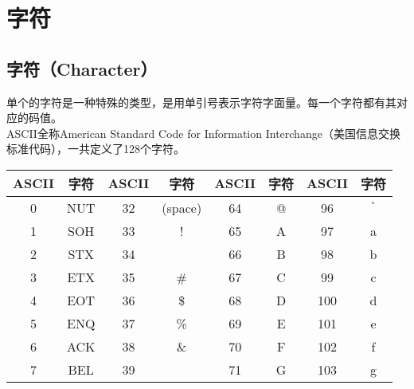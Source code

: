 \newpage

\section{字符}

\subsection{字符（Character）}

单个的字符是一种特殊的类型，是用单引号表示字符字面量。每一个字符都有其对应的码值。\\

ASCII全称American Standard Code for Information Interchange（美国信息交换标准代码），一共定义了128个字符。

\begin{longtable}{|c|c|c|c|c|c|c|c|}
	\hline
	\textbf{ASCII} & \textbf{字符} & \textbf{ASCII} & \textbf{字符} & \textbf{ASCII} & \textbf{字符}          & \textbf{ASCII} & \textbf{字符}          \\
	\hline
	0              & NUT           & 32             & (space)       & 64             & @                      & 96             & \lstinline|`| \\
	\hline
	1              & SOH           & 33             & !             & 65             & A                      & 97             & a                      \\
	\hline
	2              & STX           & 34             & \text{"}      & 66             & B                      & 98             & b                      \\
	\hline
	3              & ETX           & 35             & \#            & 67             & C                      & 99             & c                      \\
	\hline
	4              & EOT           & 36             & \$            & 68             & D                      & 100            & d                      \\
	\hline
	5              & ENQ           & 37             & \%            & 69             & E                      & 101            & e                      \\
	\hline
	6              & ACK           & 38             & \&            & 70             & F                      & 102            & f                      \\
	\hline
	7              & BEL           & 39             & \text{'}      & 71             & G                      & 103            & g                      \\

\end{longtable}
